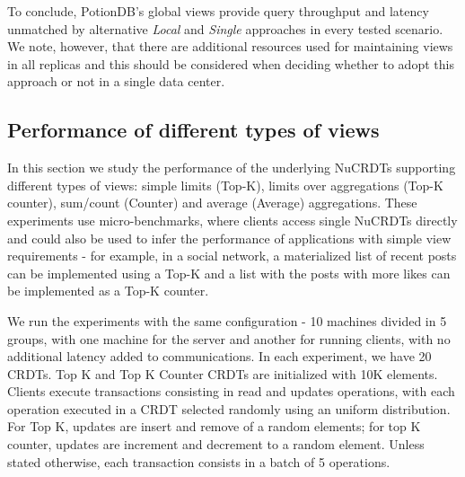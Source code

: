 \documentclass[sigplan,twocolumn,review,anonymous]{acmart}
\begin{document}
To conclude, PotionDB's global views provide query throughput and latency unmatched by alternative 
\textit{Local} and \emph{Single} approaches in every tested scenario.
We note, however,  that there are additional resources used for maintaining views in all replicas and this
should be considered when deciding whether to adopt this approach or not in a single data center.


\subsection{Performance of different types of views}
\label{subsec:microbenchmarks}

In this section we study the performance of the underlying NuCRDTs supporting different types of 
views: simple limits (Top-K), limits over aggregations (Top-K counter), sum/count (Counter) and average (Average) aggregations.
These experiments use micro-benchmarks, where clients access single NuCRDTs directly and could
also be used to infer the performance of applications with simple view requirements - for example, in a social
network, a materialized list of recent posts can be implemented using a Top-K and a list with the posts with more likes 
can be implemented as a Top-K counter.

We run the experiments with the same configuration - 10 machines
divided in 5 groups, with one machine for the server and another for running clients, with no
additional latency added to communications.  
In each experiment, we have 20 CRDTs.
Top K and Top K Counter CRDTs are initialized with 10K elements. 
Clients execute transactions consisting in read and updates operations, with each operation 
executed in a CRDT selected randomly using an uniform distribution. For Top K, updates
are insert and remove of a random elements; for top K counter, updates are increment 
and decrement to a random element.
Unless stated otherwise, each transaction consists in a batch of 5 operations.
\end{document}

